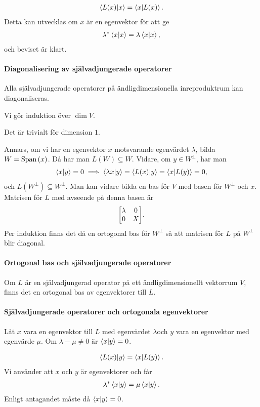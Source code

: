 \proof
\begin{align*}
	\bra{L(x)}\ket{x} = \bra{x}\ket{L(x)}.
\end{align*}
Detta kan utvecklas om $x$ är en egenvektor för att ge
\begin{align*}
	\lambda^{*}\bra{x}\ket{x} = \lambda\bra{x}\ket{x},
\end{align*}
och beviset är klart.

\paragraph{Diagonalisering av självadjungerade operatorer}
Alla självadjungerade operatorer på ändligdimensionella inreproduktrum kan diagonaliseras.

\proof
Vi gör induktion över $\dim{V}$.

Det är trivialt för dimension $1$.

Annars, om vi har en egenvektor $x$ motsvarande egenvärdet $\lambda$, bilda $W = \text{Span}\left(x\right)$. Då har man $L(W)\subseteq W$. Vidare, om $y\in W^{\perp}$, har man
\begin{align*}
	\bra{x}\ket{y} = 0\implies \bra{\lambda x}\ket{y} = \bra{L(x)}\ket{y} = \bra{x}\ket{L(y)} = 0,
\end{align*}
och $L(W^{\perp})\subseteq W^{\perp}$. Man kan vidare bilda en bas för $V$ med basen för $W^{\perp}$ och $x$. Matrisen för $L$ med avseende på denna basen är
\begin{align*}
	\mqty[
		\lambda & 0 \\
		0       & X
	].
\end{align*}
Per induktion finns det då en ortogonal bas för $W^{\perp}$ så att matrisen för $L$ på $W^{\perp}$ blir diagonal.

\paragraph{Ortogonal bas och självadjungerade operatorer}
Om $L$ är en självadjungerad operator på ett ändligdimensionellt vektorrum $V$, finns det en ortogonal bas av egenvektorer till $L$.

\proof

\paragraph{Självadjungerade operatorer och ortogonala egenvektorer}
Låt $x$ vara en egenvektor till $L$ med egenvärdet $\lambda $och $y$ vara en egenvektor med egenvärde $\mu$. Om $\lambda - \mu \neq 0$ är $\bra{x}\ket{y} = 0$.

\proof
\begin{align*}
	\bra{L(x)}\ket{y} = \bra{x}\ket{L(y)}.
\end{align*}
Vi använder att $x$ och $y$ är egenvektorer och får
\begin{align*}
	\lambda^{*}\bra{x}\ket{y} = \mu\bra{x}\ket{y}.
\end{align*}
Enligt antagandet måste då $\bra{x}\ket{y} = 0$.